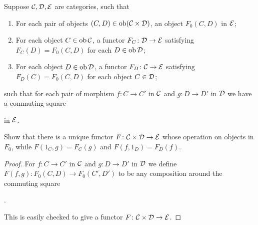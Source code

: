 \begin{exercise}{50}
    Suppose $\mathcal{C}, \mathcal{D}, \mathcal{E}$ are categories, such that
    \begin{enumerate}
        \item For each pair of objects $(C,D)\in\operatorname{ob}(\mathcal{C}\times \mathcal{D})$, an object $F_0(C,D)$ in $\mathcal{E}$;
        \item For each object $C\in\operatorname{ob}\mathcal{C}$, a functor $F_C\colon\mathcal{D}\to\mathcal{E}$ satisfying $F_C(D)=F_0(C,D)$ for each $D\in\operatorname{ob}\mathcal{D}$;
        \item For each object $D\in\operatorname{ob}\mathcal{D}$, a functor $F_D\colon\mathcal{C}\to\mathcal{E}$ satisfying $F_D(C)=F_0(C,D)$ for each object $C\in\mathcal{D}$;
    \end{enumerate}
    such that for each pair of morphism $f\colon C\to C'$ in $\mathcal{C}$ and $g\colon D\to D'$ in $\mathcal{D}$ we have a commuting square
    \begin{center}
    \end{center}
    in $\mathcal{E}$. 

    Show that there is a unique functor $F\colon\mathcal{C}\times\mathcal{D}\to\mathcal{E}$ whose operation on objects in $F_0$, while $F(1_C,g)=F_C(g)$ and $F(f,1_D)=F_D(f)$.
\end{exercise}
\begin{solution}
    \begin{proof}
        For $f\colon C\to C'$ in $\mathcal{C}$ and $g\colon D\to D'$ in $\mathcal{D}$ we define $F(f,g)\colon F_0(C,D)\to F_0(C',D')$ to be any composition around the commuting square
        \begin{center}
            .
        \end{center}
        This is easily checked to give a functor $F\colon\mathcal{C}\times\mathcal{D}\to\mathcal{E}$.
    \end{proof}
\end{solution}

